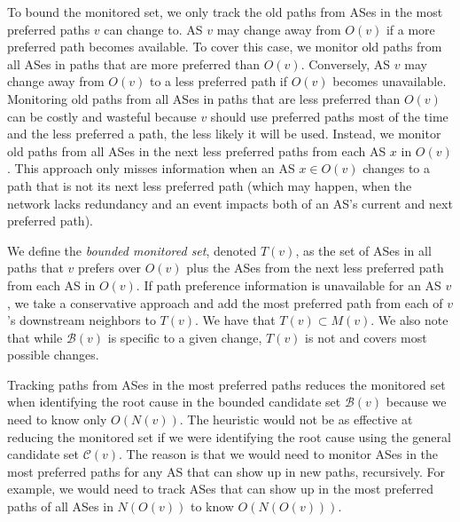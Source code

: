 To bound the monitored set, we only track the old paths from ASes in the
most preferred paths $v$ can change to.  AS $v$ may change away from
$O(v)$ if a more preferred path becomes available.  To cover this case,
we monitor old paths from all ASes in paths that are more preferred than
$O(v)$.  Conversely, AS $v$ may change away from $O(v)$ to a less
preferred path if $O(v)$ becomes unavailable. Monitoring old paths from
all ASes in paths that are less preferred than $O(v)$ can be costly and
wasteful because $v$ should use preferred paths most of the time and the
less preferred a path, the less likely it will be used.  Instead, we
monitor old paths from all ASes in the next less preferred paths from
each AS $x$ in $O(v)$.  This approach only misses information when an AS
$x \in O(v)$ changes to a path that is not its next less preferred path
(which may happen, \eg when the network lacks redundancy and an event
impacts both of an AS's current and next preferred path).


We define the \emph{bounded monitored set}, denoted $T(v)$, as the
set of ASes in all paths that $v$ prefers over $O(v)$ plus the ASes from
the next less preferred path from each AS in $O(v)$.  If path preference
information is unavailable for an AS $v$, we take a conservative
approach and add the most preferred path from each of $v$'s downstream neighbors
to $T(v)$.  We have that $T(v) \subset M(v)$.  We also note that while
$\mathcal{B}(v)$ is specific to a given change, $T(v)$ is not and covers
most possible changes.

Tracking paths from ASes in the most preferred paths reduces the
monitored set when identifying the root cause in the bounded candidate
set $\mathcal{B}(v)$ because we need to know only $O(N(v))$.  
The
heuristic would not be as effective at reducing the monitored set if we were
identifying the root cause using the general candidate set
$\mathcal{C}(v)$.  The reason is that we would need to monitor ASes in
the most preferred paths for any AS that can show up in new paths,
recursively.  For example, we would need to track ASes that can show up
in the most preferred paths of all ASes in $N(O(v))$ to know
$O(N(O(v)))$.

